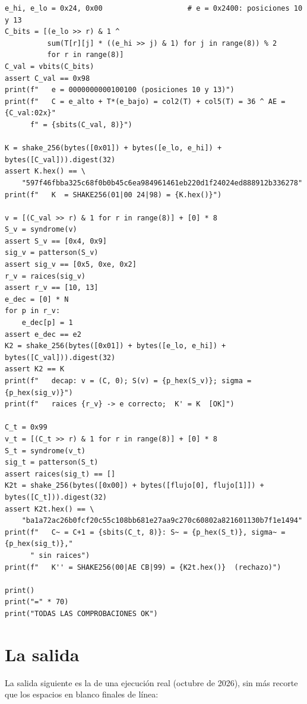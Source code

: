 \begin{lstlisting}
e_hi, e_lo = 0x24, 0x00                    # e = 0x2400: posiciones 10 y 13
C_bits = [(e_lo >> r) & 1 ^
          sum(T[r][j] * ((e_hi >> j) & 1) for j in range(8)) % 2
          for r in range(8)]
C_val = vbits(C_bits)
assert C_val == 0x98
print(f"   e = 0000000000100100 (posiciones 10 y 13)")
print(f"   C = e_alto + T*(e_bajo) = col2(T) + col5(T) = 36 ^ AE = {C_val:02x}"
      f" = {sbits(C_val, 8)}")

K = shake_256(bytes([0x01]) + bytes([e_lo, e_hi]) + bytes([C_val])).digest(32)
assert K.hex() == \
    "597f46fbba325c68f0b0b45c6ea984961461eb220d1f24024ed888912b336278"
print(f"   K  = SHAKE256(01|00 24|98) = {K.hex()}")

v = [(C_val >> r) & 1 for r in range(8)] + [0] * 8
S_v = syndrome(v)
assert S_v == [0x4, 0x9]
sig_v = patterson(S_v)
assert sig_v == [0x5, 0xe, 0x2]
r_v = raices(sig_v)
assert r_v == [10, 13]
e_dec = [0] * N
for p in r_v:
    e_dec[p] = 1
assert e_dec == e2
K2 = shake_256(bytes([0x01]) + bytes([e_lo, e_hi]) + bytes([C_val])).digest(32)
assert K2 == K
print(f"   decap: v = (C, 0); S(v) = {p_hex(S_v)}; sigma = {p_hex(sig_v)}")
print(f"   raices {r_v} -> e correcto;  K' = K  [OK]")

C_t = 0x99
v_t = [(C_t >> r) & 1 for r in range(8)] + [0] * 8
S_t = syndrome(v_t)
sig_t = patterson(S_t)
assert raices(sig_t) == []
K2t = shake_256(bytes([0x00]) + bytes([flujo[0], flujo[1]]) + bytes([C_t])).digest(32)
assert K2t.hex() == \
    "ba1a72ac26b0fcf20c55c108bb681e27aa9c270c60802a821601130b7f1e1494"
print(f"   C~ = C+1 = {sbits(C_t, 8)}: S~ = {p_hex(S_t)}, sigma~ = {p_hex(sig_t)},"
      " sin raices")
print(f"   K'' = SHAKE256(00|AE CB|99) = {K2t.hex()}  (rechazo)")

print()
print("=" * 70)
print("TODAS LAS COMPROBACIONES OK")
\end{lstlisting}

\section{La salida}

La salida siguiente es la de una ejecución real (octubre de 2026),
sin más recorte que los espacios en blanco finales de línea:

